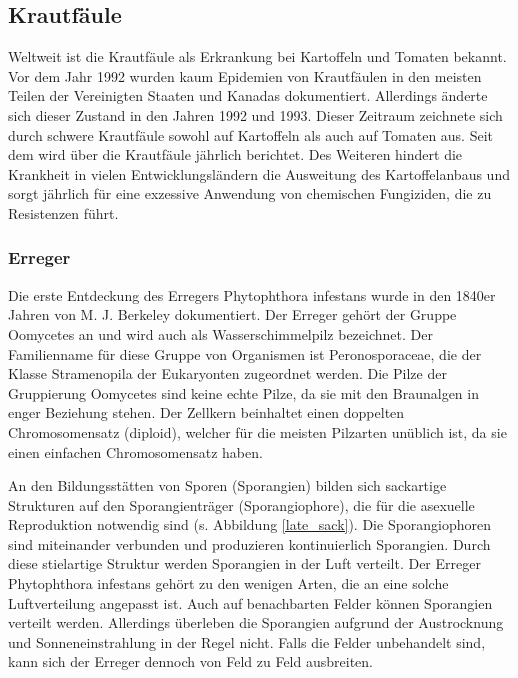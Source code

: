 \subsection{Krautfäule}

Weltweit ist die Krautfäule\cite{rapid_detect} als Erkrankung bei Kartoffeln und Tomaten bekannt. Vor dem Jahr 1992 wurden kaum Epidemien von Krautfäulen in den meisten Teilen der Vereinigten Staaten und Kanadas dokumentiert. Allerdings änderte sich dieser Zustand in den Jahren 1992 und 1993. Dieser Zeitraum zeichnete sich durch schwere Krautfäule sowohl auf Kartoffeln als auch auf Tomaten aus. Seit dem wird über die Krautfäule jährlich berichtet. Des Weiteren hindert die Krankheit in vielen Entwicklungsländern die Ausweitung des Kartoffelanbaus und sorgt jährlich für eine exzessive Anwendung von chemischen Fungiziden, die zu Resistenzen führt.  



\subsubsection{Erreger}


Die erste Entdeckung des Erregers\cite{lbopat} Phytophthora infestans wurde in den 1840er Jahren von M. J. Berkeley dokumentiert. Der Erreger gehört der Gruppe Oomycetes an und wird auch als Wasserschimmelpilz bezeichnet. Der Familienname für diese Gruppe von Organismen ist Peronosporaceae, die der Klasse Stramenopila der Eukaryonten zugeordnet werden. Die Pilze der Gruppierung Oomycetes sind keine echte Pilze, da sie mit den Braunalgen in enger Beziehung stehen. Der Zellkern beinhaltet einen doppelten Chromosomensatz (diploid), welcher für die meisten Pilzarten unüblich ist, da sie einen einfachen Chromosomensatz haben. 

An den Bildungsstätten von Sporen (Sporangien) bilden sich sackartige Strukturen auf den Sporangienträger (Sporangiophore), die für die asexuelle Reproduktion notwendig sind (s. Abbildung \ref{late_sack}). Die Sporangiophoren sind miteinander verbunden und produzieren kontinuierlich Sporangien. Durch diese stielartige Struktur werden Sporangien in der Luft verteilt. Der Erreger Phytophthora infestans gehört zu den wenigen Arten, die an eine solche Luftverteilung angepasst ist. Auch auf benachbarten Felder können Sporangien verteilt werden. Allerdings überleben die Sporangien aufgrund der Austrocknung und Sonneneinstrahlung in der Regel nicht. Falls die Felder unbehandelt sind, kann sich der Erreger dennoch von Feld zu Feld ausbreiten\cite{lbopat}.


